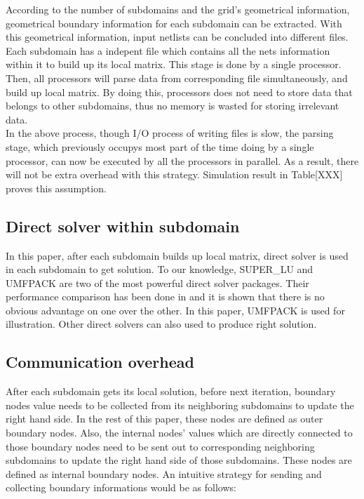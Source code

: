 \documentclass{sig-alternate}
\begin{document}
	According to the number of subdomains and the grid's geometrical information, geometrical boundary information for each
	subdomain can be extracted. With this geometrical information, input netlists can be concluded into different files.
	Each subdomain has a indepent file which contains all the nets information within it to build up its local matrix. 
	This stage is done by a single processor. Then, all processors will parse data from corresponding file simultaneously, and build 
	up local matrix. By doing this, processors does not need to store data that belongs to other subdomains, thus no memory is 
	wasted for storing irrelevant data. \\

	In the above process, though I/O process of writing files is slow, the parsing stage, which previously occupys most part of the 
	time doing by a single processor, can now be executed by all the processors in parallel. As a result, there will not be extra
	overhead with this strategy. Simulation result in Table[XXX] proves this assumption.\\
	 
   \subsection{Direct solver within subdomain}
	In this paper, after each subdomain builds up local matrix, direct solver is used in each subdomain to get solution. To our 
	knowledge, SUPER\_LU and UMFPACK are 
	two of the most powerful direct solver packages. Their performance comparison has been done 
	in\cite{package} and it is shown that there is no obvious advantage on one over the other. In this paper, UMFPACK is used for 
	illustration. Other direct solvers can also used to produce right solution.\\

    \subsection{Communication overhead}
	After each subdomain gets its local solution, before next iteration, boundary nodes value needs to be collected from its 
	neighboring subdomains to update
	the right hand side. In the rest of this paper, these nodes are defined as outer boundary nodes. Also, the internal nodes' 
	values which are directly connected to those boundary nodes need to be sent out
	to corresponding neighboring subdomains to update the right hand side of those subdomains. These nodes are defined as internal
	boundary nodes. An intuitive strategy for sending and collecting boundary informations would be as follows:\\
\end{document}
